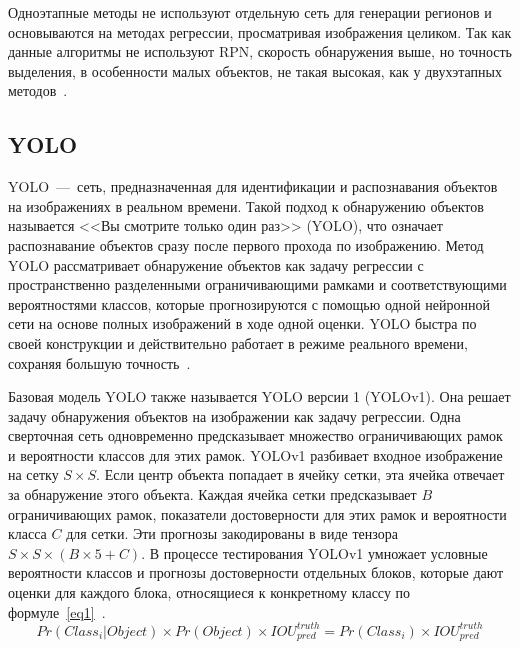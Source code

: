 Одноэтапные методы не используют отдельную сеть для генерации регионов и основываются на методах регрессии, просматривая изображения целиком.
Так как данные алгоритмы не используют RPN, скорость обнаружения выше, но точность выделения, в особенности малых объектов, не такая высокая, как у двухэтапных методов~\cite{base}.

\subsection{YOLO}

YOLO~---~сеть, предназначенная для идентификации и распознавания объектов на изображениях в реальном времени.
Такой подход к обнаружению объектов называется <<Вы смотрите только один раз>> (YOLO), что означает распознавание объектов сразу после первого прохода по изображению.
Метод YOLO рассматривает обнаружение объектов как задачу регрессии с пространственно разделенными ограничивающими рамками и соответствующими вероятностями классов, которые прогнозируются с помощью одной нейронной сети на основе полных изображений в ходе одной оценки.
YOLO быстра по своей конструкции и действительно работает в режиме реального времени, сохраняя большую точность~\cite{base, all}.

Базовая модель YOLO также называется YOLO версии 1 (YOLOv1).
Она решает задачу обнаружения объектов на изображении как задачу регрессии.
Одна сверточная сеть одновременно предсказывает множество ограничивающих рамок и вероятности классов для этих рамок.
YOLOv1 разбивает входное изображение на сетку $S \times S$.
Если центр объекта попадает в ячейку сетки, эта ячейка отвечает за обнаружение этого объекта.
Каждая ячейка сетки предсказывает $B$ ограничивающих рамок, показатели достоверности для этих рамок и вероятности класса $C$ для сетки.
Эти прогнозы закодированы в виде тензора $S \times S \times (B \times 5 + C)$.
В процессе тестирования YOLOv1 умножает условные вероятности классов и прогнозы достоверности отдельных блоков, которые дают оценки для каждого блока, относящиеся к конкретному классу по формуле~\ref{eq1}~\cite{all}.
\begin{equation}
	\label{eq1}
	Pr(Class_{i} | Object) \times Pr(Object) \times IOU^{truth}_{pred} = Pr(Class_{i}) \times IOU^{truth}_{pred}
\end{equation}

